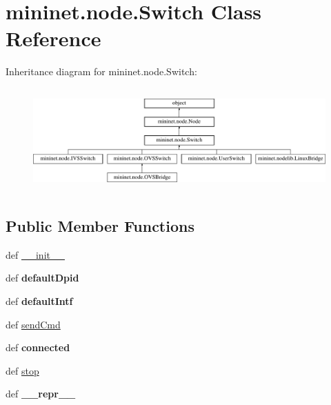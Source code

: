 \hypertarget{classmininet_1_1node_1_1Switch}{\section{mininet.\-node.\-Switch Class Reference}
\label{classmininet_1_1node_1_1Switch}
}
Inheritance diagram for mininet.\-node.\-Switch\-:\begin{figure}[H]
\begin{center}
\leavevmode
\includegraphics[height=4.000000cm]{classmininet_1_1node_1_1Switch}
\end{center}
\end{figure}
\subsection*{Public Member Functions}
\begin{DoxyCompactItemize}
\item 
def \hyperlink{classmininet_1_1node_1_1Switch_ad4abb0f4cb72e776d54c8327e262ef81}{\-\_\-\-\_\-init\-\_\-\-\_\-}
\item 
\hypertarget{classmininet_1_1node_1_1Switch_accc4b88c09e91e7ce7a7ec5fa8a5f22e}{def {\bfseries default\-Dpid}}\label{classmininet_1_1node_1_1Switch_accc4b88c09e91e7ce7a7ec5fa8a5f22e}

\item 
\hypertarget{classmininet_1_1node_1_1Switch_aae622083424ca6cacd7dd478dd7f86b0}{def {\bfseries default\-Intf}}\label{classmininet_1_1node_1_1Switch_aae622083424ca6cacd7dd478dd7f86b0}

\item 
def \hyperlink{classmininet_1_1node_1_1Switch_abce85860d0521c75d06fd237eec3fc4d}{send\-Cmd}
\item 
\hypertarget{classmininet_1_1node_1_1Switch_a4c888cb445b0e89ad07a5d7fbd8c1f1a}{def {\bfseries connected}}\label{classmininet_1_1node_1_1Switch_a4c888cb445b0e89ad07a5d7fbd8c1f1a}

\item 
def \hyperlink{classmininet_1_1node_1_1Switch_ac02447bd7e69ed56b09ca9a440a32459}{stop}
\item 
\hypertarget{classmininet_1_1node_1_1Switch_a95ab9bfcd138235fa4697a3782ad0c48}{def {\bfseries \-\_\-\-\_\-repr\-\_\-\-\_\-}}\label{classmininet_1_1node_1_1Switch_a95ab9bfcd138235fa4697a3782ad0c48}

\end{DoxyCompactItemize}
